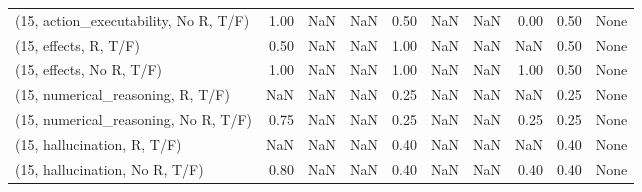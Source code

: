 \begin{table*}[h!]
\begin{adjustbox}{width=2\columnwidth,center}
\begin{tabular}{lrrr|rrr|rrr}
(15, action\_executability, No R, T/F) &                      1.00 &                   NaN &                       NaN &                          0.50 &                       NaN &                           NaN &                                   0.00 &                               0.50 &                                  None \\
(15, effects, R, T/F)                 &                      0.50 &                   NaN &                       NaN &                          1.00 &                       NaN &                           NaN &                                    NaN &                               0.50 &                                  None \\
(15, effects, No R, T/F)              &                      1.00 &                   NaN &                       NaN &                          1.00 &                       NaN &                           NaN &                                   1.00 &                               0.50 &                                  None \\
(15, numerical\_reasoning, R, T/F)     &                       NaN &                   NaN &                       NaN &                          0.25 &                       NaN &                           NaN &                                    NaN &                               0.25 &                                  None \\
(15, numerical\_reasoning, No R, T/F)  &                      0.75 &                   NaN &                       NaN &                          0.25 &                       NaN &                           NaN &                                   0.25 &                               0.25 &                                  None \\
(15, hallucination, R, T/F)           &                       NaN &                   NaN &                       NaN &                          0.40 &                       NaN &                           NaN &                                    NaN &                               0.40 &                                  None \\
(15, hallucination, No R, T/F)        &                      0.80 &                   NaN &                       NaN &                          0.40 &                       NaN &                           NaN &                                   0.40 &                               0.40 &                                  None \\

\end{tabular}
\end{adjustbox}
\end{table*}
